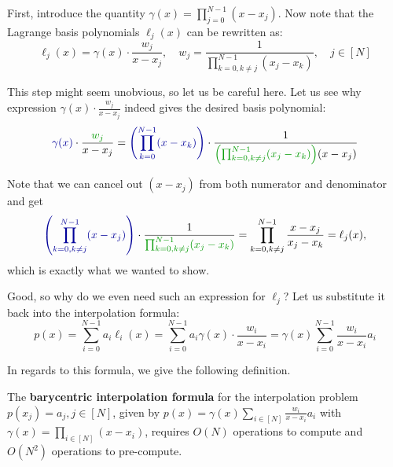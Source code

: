 \documentclass[../../book.tex]{subfiles}
\begin{document}
First, introduce the quantity $\gamma(x) = \prod_{j=0}^{N-1}(x-x_j)$. Now note that 
the Lagrange basis polynomials $\ell_j(x)$ can be rewritten as:
\begin{equation*}
    \ell_j(x) = \gamma(x) \cdot \frac{w_j}{x-x_j}, \quad w_j = \frac{1}{\prod_{k=0,k \neq j}^{N-1}(x_j-x_k)}, \quad j \in [N]
\end{equation*}

\begin{remark}
    This step might seem unobvious, so let us be careful here. Let us see why expression $\gamma(x) \cdot \frac{w_j}{x-x_j}$ 
    indeed gives the desired basis polynomial:
    \begin{equation*}
        \textcolor{blue!60!black}{\gamma(x)} \cdot \frac{\textcolor{green!60!black}{w_j}}{x-x_j} = \textcolor{blue!60!black}{\left(\prod_{k=0}^{N-1}(x-x_k) \right)} \cdot \frac{1}{\textcolor{green!60!black}{\left(\prod_{k=0,k \neq j}^{N-1}(x_j-x_k)\right)}(x-x_j)}
    \end{equation*}

    Note that we can cancel out $(x-x_j)$ from both numerator and denominator and get
    \begin{equation*}
        \textcolor{blue!60!black}{\left(\prod_{k=0,k\neq j}^{N-1}(x-x_j) \right)} \cdot \frac{1}{\textcolor{green!60!black}{\prod_{k=0,k \neq j}^{N-1}(x_j-x_k)}} = \prod_{k=0,k \neq j}^{N-1} \frac{x-x_j}{x_j-x_k} = \ell_j(x),
    \end{equation*}
    which is exactly what we wanted to show.
\end{remark}

Good, so why do we even need such an expression for $\ell_j$? Let us substitute it back into the interpolation formula:
\begin{equation*}
    p(x) = \sum_{i=0}^{N-1} a_i \ell_i(x) = \sum_{i=0}^{N-1}a_i \gamma(x) \cdot \frac{w_i}{x-x_i} = \gamma(x) \sum_{i=0}^{N-1} \frac{w_i}{x-x_i}a_i
\end{equation*}

In regards to this formula, we give the following definition.
\begin{proposition}\label{prop:barycentric}
    The \textbf{barycentric interpolation formula} for the interpolation problem
    $p(x_j)=a_j, j \in [N]$, given by $p(x) = \gamma(x) \sum_{i \in [N]}
    \frac{w_i}{x-x_i}a_i$ with $\gamma(x)=\prod_{i \in [N]}(x-x_i)$, requires $O(N)$ operations to compute and $O(N^2)$
    operations to pre-compute.
\end{proposition}
\end{document}
